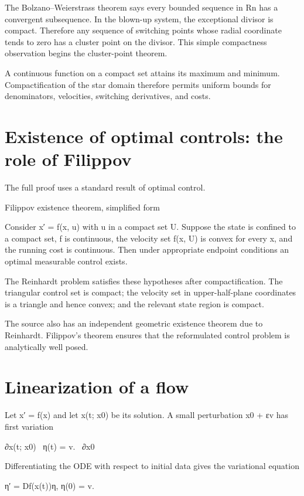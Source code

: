 The Bolzano–Weierstrass theorem says every bounded sequence in Rn has a convergent subsequence. In the blown-up system, the exceptional divisor is compact. Therefore any sequence of switching points whose radial coordinate tends to zero has a cluster point on the divisor. This simple compactness observation begins the cluster-point theorem.


A continuous function on a compact set attains its maximum and minimum. Compactification of the star domain therefore permits uniform bounds for denominators, velocities, switching derivatives, and costs.


\section{Existence of optimal controls: the role of Filippov}

The full proof uses a standard result of optimal control.


Filippov existence theorem, simplified form


Consider x′ = f(x, u) with u in a compact set U. Suppose the state is confined to a compact set, f is continuous, the velocity set f(x, U) is convex for every x, and the running cost is continuous. Then under appropriate endpoint conditions an optimal measurable control exists.


The Reinhardt problem satisfies these hypotheses after compactification. The triangular control set is compact; the velocity set in upper-half-plane coordinates is a triangle and hence convex; and the relevant state region is compact.


The source also has an independent geometric existence theorem due to Reinhardt. Filippov’s theorem ensures that the reformulated control problem is analytically well posed.


\section{Linearization of a flow}

Let x′ = f(x) and let x(t; x0) be its solution. A small perturbation x0 + εv has first variation


\begin{displaytext}
∂x(t; x0) \
η(t) = v. \
∂x0
\end{displaytext}

Differentiating the ODE with respect to initial data gives the variational equation


\begin{displaytext}
η′ = Df(x(t))η, η(0) = v.
\end{displaytext}

